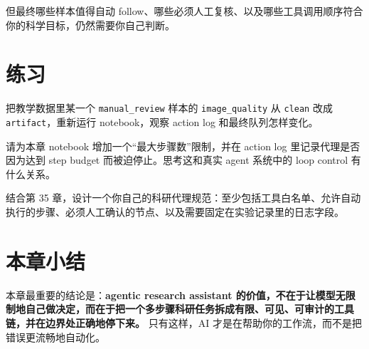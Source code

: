 但最终哪些样本值得自动 follow、哪些必须人工复核、以及哪些工具调用顺序符合你的科学目标，仍然需要你自己判断。

\section{练习}

\begin{exercisebox}[基础练习]
把教学数据里某一个 \texttt{manual\_review} 样本的 \texttt{image\_quality} 从 \texttt{clean} 改成 \texttt{artifact}，重新运行 notebook，观察 action log 和最终队列怎样变化。
\end{exercisebox}

\begin{exercisebox}[进阶练习]
请为本章 notebook 增加一个“最大步骤数”限制，并在 action log 里记录代理是否因为达到 step budget 而被迫停止。思考这和真实 agent 系统中的 loop control 有什么关系。
\end{exercisebox}

\begin{exercisebox}[开放练习]
结合第 35 章，设计一个你自己的科研代理规范：至少包括工具白名单、允许自动执行的步骤、必须人工确认的节点、以及需要固定在实验记录里的日志字段。
\end{exercisebox}

\section{本章小结}

本章最重要的结论是：\textbf{agentic research assistant 的价值，不在于让模型无限制地自己做决定，而在于把一个多步骤科研任务拆成有限、可见、可审计的工具链，并在边界处正确地停下来。} 只有这样，AI 才是在帮助你的工作流，而不是把错误更流畅地自动化。
